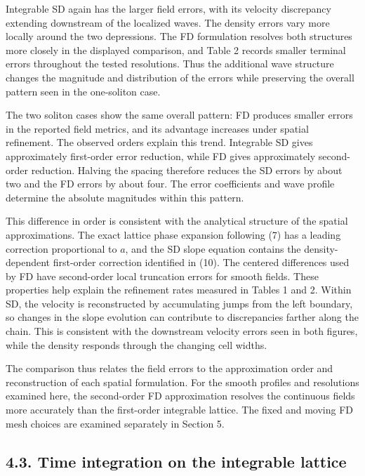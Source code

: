 \documentclass[11pt,a4paper]{article}
\begin{document}
Integrable SD again has the larger field errors, with its velocity discrepancy extending downstream of the localized waves. The density errors vary more locally around the two depressions. The FD formulation resolves both structures more closely in the displayed comparison, and Table 2 records smaller terminal errors throughout the tested resolutions. Thus the additional wave structure changes the magnitude and distribution of the errors while preserving the overall pattern seen in the one-soliton case.

The two soliton cases show the same overall pattern: FD produces smaller errors in the reported field metrics, and its advantage increases under spatial refinement. The observed orders explain this trend. Integrable SD gives approximately first-order error reduction, while FD gives approximately second-order reduction. Halving the spacing therefore reduces the SD errors by about two and the FD errors by about four. The error coefficients and wave profile determine the absolute magnitudes within this pattern.

This difference in order is consistent with the analytical structure of the spatial approximations. The exact lattice phase expansion following (7) has a leading correction proportional to \(a\), and the SD slope equation contains the density-dependent first-order correction identified in (10). The centered differences used by FD have second-order local truncation errors for smooth fields. These properties help explain the refinement rates measured in Tables 1 and 2. Within SD, the velocity is reconstructed by accumulating jumps from the left boundary, so changes in the slope evolution can contribute to discrepancies farther along the chain. This is consistent with the downstream velocity errors seen in both figures, while the density responds through the changing cell widths.

The comparison thus relates the field errors to the approximation order and reconstruction of each spatial formulation. For the smooth profiles and resolutions examined here, the second-order FD approximation resolves the continuous fields more accurately than the first-order integrable lattice. The fixed and moving FD mesh choices are examined separately in Section 5.

\FloatBarrier
\subsection*{4.3. Time integration on the integrable lattice}
\end{document}

